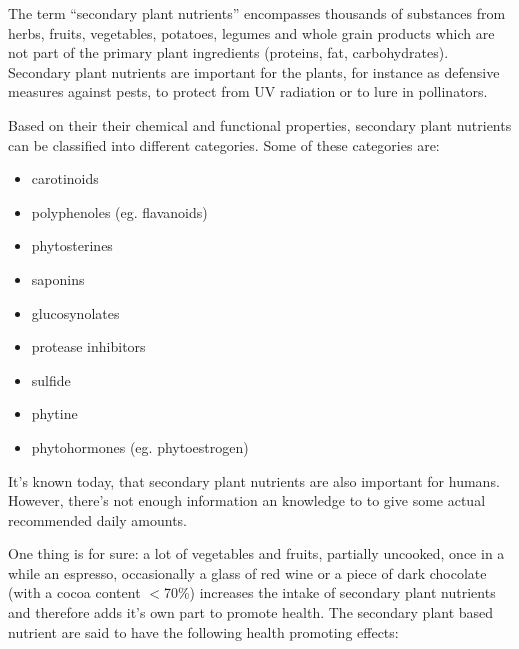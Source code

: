 \documentclass[../main.tex]{subfiles}
\begin{document}
The term ``secondary plant nutrients'' encompasses thousands of substances from herbs, fruits, vegetables,
potatoes, legumes and whole grain products which are not part of the primary plant ingredients (proteins, fat, carbohydrates).
Secondary plant nutrients are important for the plants, for instance as defensive measures against pests,
to protect from UV radiation or to lure in pollinators.


Based on their their chemical and functional properties, secondary plant nutrients can be classified into different categories.
Some of these categories are:
\begin{itemize}
\item carotinoids
\item polyphenoles (eg. flavanoids)
\item phytosterines
\item saponins
\item glucosynolates
\item protease inhibitors
\item sulfide
\item phytine
  \item phytohormones (eg. phytoestrogen)
  \end{itemize}

  It's known today, that secondary plant nutrients are also important for humans.
  However, there's not enough information an knowledge to to give some actual recommended daily amounts.

  One thing is for sure: a lot of vegetables and fruits, partially uncooked, once in a while an espresso, occasionally a glass of red wine
  or a piece of dark chocolate (with a cocoa content $<$70\%) increases the intake of secondary plant nutrients
  and therefore adds it's own part to promote health.
  The secondary plant based nutrient are said to have the following health promoting effects:
\end{document}
